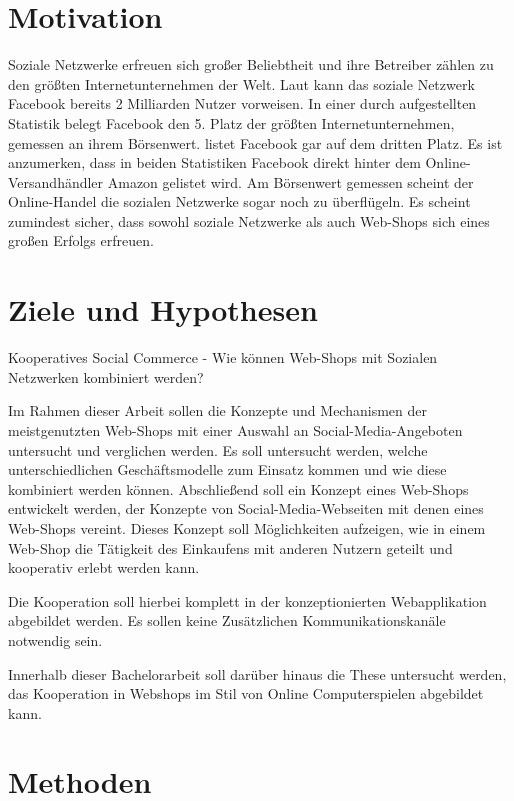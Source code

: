 \section{Motivation}

Soziale Netzwerke erfreuen sich großer Beliebtheit und ihre Betreiber zählen zu den größten Internetunternehmen der Welt. Laut \textcite{sokolov:facebook} kann das soziale Netzwerk Facebook bereits 2 Milliarden Nutzer vorweisen. In einer durch \textcite{nasdaq} aufgestellten Statistik belegt Facebook den 5. Platz der größten Internetunternehmen, gemessen an ihrem Börsenwert. \textcite{mittermeier} listet Facebook gar auf dem dritten Platz. Es ist anzumerken, dass in beiden Statistiken Facebook direkt hinter dem Online-Versandhändler Amazon gelistet wird. Am Börsenwert gemessen
scheint der Online-Handel die sozialen Netzwerke sogar noch zu überflügeln. Es scheint zumindest sicher, dass sowohl soziale Netzwerke als auch Web-Shops sich eines großen Erfolgs erfreuen.


\section{Ziele und Hypothesen}

Kooperatives Social Commerce
- Wie können Web-Shops mit Sozialen Netzwerken kombiniert werden?

Im Rahmen dieser Arbeit sollen die Konzepte und Mechanismen der meistgenutzten Web-Shops mit einer Auswahl an Social-Media-Angeboten untersucht und verglichen werden. Es soll untersucht werden, welche unterschiedlichen Geschäftsmodelle zum Einsatz kommen und wie diese kombiniert werden können. Abschließend soll ein Konzept eines Web-Shops entwickelt werden, der Konzepte von Social-Media-Webseiten mit denen eines Web-Shops vereint. Dieses Konzept soll Möglichkeiten aufzeigen, wie in einem Web-Shop die Tätigkeit des Einkaufens mit anderen Nutzern geteilt und kooperativ erlebt werden kann.

Die Kooperation soll hierbei komplett in der konzeptionierten Webapplikation abgebildet werden. Es sollen keine Zusätzlichen Kommunikationskanäle notwendig sein.

Innerhalb dieser Bachelorarbeit soll darüber hinaus die These untersucht werden, das Kooperation in Webshops im Stil von Online Computerspielen abgebildet kann.


\section{Methoden}

